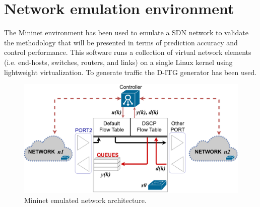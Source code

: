 \section{Network emulation environment} \label{sec:SDNNetSim}
The Mininet environment \cite{Mininet} has been used to emulate a SDN network to validate the methodology that will be presented in terms of prediction accuracy and control performance. This software runs a collection of virtual network elements (i.e. end-hosts, switches, routers, and links) on a single Linux kernel using lightweight virtualization. 
To generate traffic the D-ITG generator \cite{Avallone2004, Botta2012, Botta2013} has been used.

\begin{figure}[htb!]
	\centering
	\includegraphics[keepaspectratio,width=\columnwidth]{figure/SDN_net_EPS.eps}
	\caption{Mininet emulated network architecture.}
	\label{fig:{Network}}
\end{figure}

